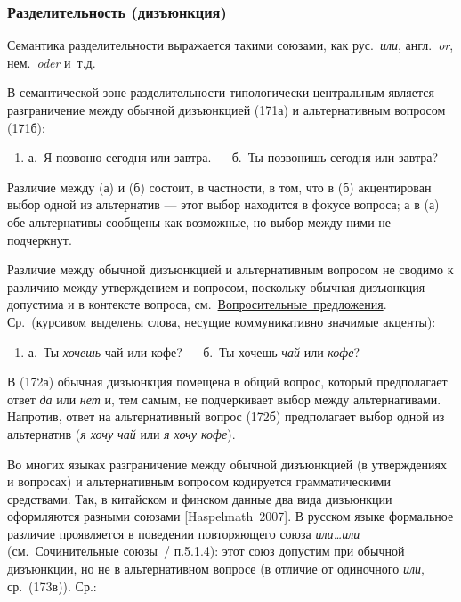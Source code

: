 \subsubsection{Разделительность
  (дизъюнкция)}\label{ux440ux430ux437ux434ux435ux43bux438ux442ux435ux43bux44cux43dux43eux441ux442ux44c-ux434ux438ux437ux44aux44eux43dux43aux446ux438ux44f}

Семантика разделительности выражается такими союзами, как
рус.~\textit{или}, англ.~\textit{or}, нем.~\textit{oder} и~т.д.

В семантической зоне разделительности типологически центральным является
разграничение между обычной дизъюнкцией (171а) и альтернативным вопросом
(171б):

\begin{enumerate}
  \def\labelenumi{(\arabic{enumi})}
  \setcounter{enumi}{170}
  \item
        а.~Я позвоню сегодня или завтра. --- б.~Ты позвонишь сегодня или
        завтра?
\end{enumerate}

Различие между (а) и (б) состоит, в частности, в том, что в (б)
акцентирован выбор одной из альтернатив --- этот выбор находится в фокусе
вопроса; а в (а) обе альтернативы сообщены как возможные, но выбор между
ними не подчеркнут.

Различие между обычной дизъюнкцией и альтернативным вопросом не сводимо
к различию между утверждением и вопросом, поскольку обычная дизъюнкция
допустима и в контексте вопроса,
см.~\underline{Вопросительные~предложения}. Ср.~(курсивом выделены
слова, несущие коммуникативно значимые акценты):

\begin{enumerate}
  \def\labelenumi{(\arabic{enumi})}
  \setcounter{enumi}{171}
  \item
        а.~Ты \textit{хочешь} чай или кофе? --- б.~Ты хочешь \textit{чай} или
        \textit{кофе}?
\end{enumerate}

В (172а) обычная дизъюнкция помещена в общий вопрос, который
предполагает ответ \textit{да} или \textit{нет} и, тем самым, не
подчеркивает выбор между альтернативами. Напротив, ответ на
альтернативный вопрос (172б) предполагает выбор одной из альтернатив
(\textit{я хочу чай} или \textit{я хочу кофе}).

Во многих языках разграничение между обычной дизъюнкцией (в утверждениях
и вопросах) и альтернативным вопросом кодируется грамматическими
средствами. Так, в китайском и финском данные два вида дизъюнкции
оформляются разными союзами {[}Haspelmath~2007{]}. В русском языке
формальное различие проявляется в поведении повторяющего союза
\textit{или\ldots или} (см.~\underline{Сочинительные союзы~/ п.5.1.4}):
этот союз допустим при обычной дизъюнкции, но не в альтернативном
вопросе (в отличие от одиночного \textit{или}, ср.~(173в)). Ср.:

